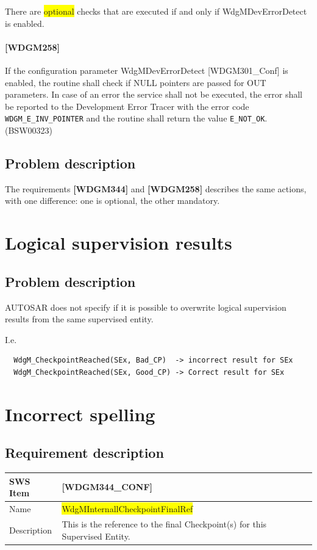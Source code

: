 There are \colorbox{yellow}{optional} checks that are executed if and
only if WdgMDevErrorDetect is enabled.
\paragraph{[WDGM258]} If the configuration parameter WdgMDevErrorDetect
[WDGM301\_Conf] is enabled, the routine shall check if NULL pointers
are passed for OUT parameters. In case of an error the service shall
not be executed, the error shall be reported to the Development Error
Tracer with the error code \lstinline!WDGM_E_INV_POINTER! and the routine shall
return the value \lstinline!E_NOT_OK!.  (BSW00323)

\subsection{Problem description}
The requirements \textbf{[WDGM344]} and \textbf{[WDGM258]} describes
the same actions, with one difference: one is optional, the other mandatory.

\section{Logical supervision results}
\subsection{Problem description}
AUTOSAR does not specify if it is possible to overwrite logical supervision
results from the same supervised entity.

I.e.
\begin{lstlisting}
  WdgM_CheckpointReached(SEx, Bad_CP)  -> incorrect result for SEx
  WdgM_CheckpointReached(SEx, Good_CP) -> Correct result for SEx
\end{lstlisting}

\section{Incorrect spelling}
\subsection{Requirement description}
\begin{tabular}{| l | l |} \hline
SWS Item & \textbf{[WDGM344\_CONF]}\\\hline
Name     & \colorbox{yellow}{WdgMInternallCheckpointFinalRef}\\\hline
Description & This is the reference to the final Checkpoint(s) for
this Supervised Entity.\\\hline
\end{tabular}


